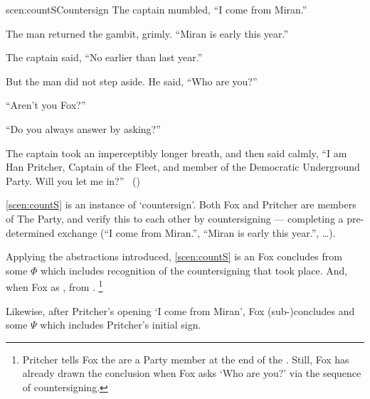 \begin{note}
  \begin{rscenario}{scen:countS}{Countersign}%
    \indent The captain mumbled, ``I come from Miran.''

    The man returned the gambit, grimly.
    ``Miran is early this year.''

    The captain said, ``No earlier than last year.''

    But the man did not step aside.
    He said, ``Who are you?''

    ``Aren't you Fox?''

    ``Do you always answer by asking?''

    The captain took an imperceptibly longer breath, and then said calmly,
    ``I am Han Pritcher, Captain of the Fleet, and member of the Democratic Underground Party.
    Will you let me in?''%
    \mbox{ }\hfill\mbox{(\cite[70]{Asimov:1945aa})}%
    \newline
  \end{rscenario}

  \noindent%
  \autoref{scen:countS} is an instance of `countersign'.
  Both Fox and Pritcher are members of The Party, and verify this to each other by countersigning --- completing a pre-determined exchange (``I come from Miran.'', ``Miran is early this year.'', \dots).

  \noindent%
  Applying the abstractions introduced, \autoref{scen:countS} is an \eiw{} Fox concludes  from some \pool{} \(\Phi\) which includes recognition of the countersigning that took place.
  And, when Fox \evals{} \propI{\signConA{}} as ,  from .%
  \footnote{
    Pritcher tells Fox the are a Party member at the end of the \scen{}.
    Still, Fox has already drawn the conclusion when Fox asks `Who are you?' via the sequence of countersigning.
  }

  Likewise, after Pritcher's opening `I come from Miran', Fox (sub-)concludes  and some \pool{} \(\Psi\) which includes Pritcher's initial sign.
\end{note}


